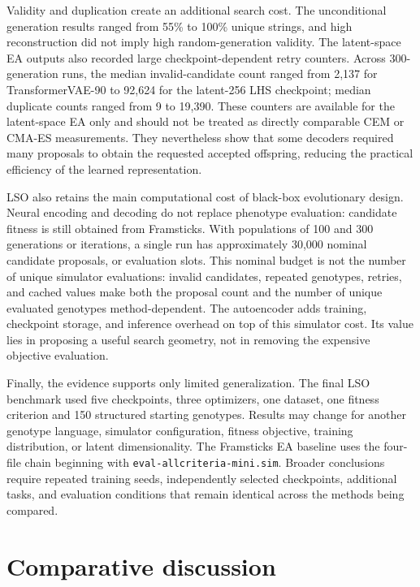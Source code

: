 Validity and duplication create an additional search cost. The unconditional generation results ranged from 55\% to 100\% unique strings, and high reconstruction did not imply high random-generation validity. The latent-space EA outputs also recorded large checkpoint-dependent retry counters. Across 300-generation runs, the median invalid-candidate count ranged from 2,137 for TransformerVAE-90 to 92,624 for the latent-256 LHS checkpoint; median duplicate counts ranged from 9 to 19,390. These counters are available for the latent-space EA only and should not be treated as directly comparable CEM or CMA-ES measurements. They nevertheless show that some decoders required many proposals to obtain the requested accepted offspring, reducing the practical efficiency of the learned representation.

LSO also retains the main computational cost of black-box evolutionary design. Neural encoding and decoding do not replace phenotype evaluation: candidate fitness is still obtained from Framsticks. With populations of 100 and 300 generations or iterations, a single run has approximately 30,000 nominal candidate proposals, or evaluation slots. This nominal budget is not the number of unique simulator evaluations: invalid candidates, repeated genotypes, retries, and cached values make both the proposal count and the number of unique evaluated genotypes method-dependent. The autoencoder adds training, checkpoint storage, and inference overhead on top of this simulator cost. Its value lies in proposing a useful search geometry, not in removing the expensive objective evaluation.

Finally, the evidence supports only limited generalization. The final LSO benchmark used five checkpoints, three optimizers, one \fone{} dataset, one fitness criterion and 150 structured starting genotypes. Results may change for another genotype language, simulator configuration, fitness objective, training distribution, or latent dimensionality. The Framsticks EA baseline uses the four-file chain beginning with \texttt{eval-allcriteria-mini.sim}. Broader conclusions require repeated training seeds, independently selected checkpoints, additional tasks, and evaluation conditions that remain identical across the methods being compared.


\section{Comparative discussion}

